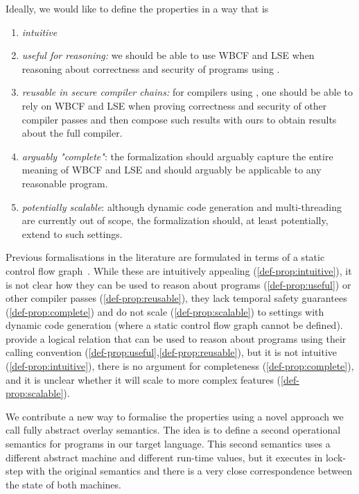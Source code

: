 \documentclass[acmsmall,screen]{acmart}\settopmatter{}
\begin{document}
Ideally, we would like to define the properties in a way that is
\begin{enumerate}
\item {\itshape intuitive} \label{def-prop:intuitive}
\item {\itshape useful for reasoning:} we should be able to use WBCF and LSE when reasoning about correctness and security of programs using \stktokens{}. \label{def-prop:useful}
\item {\itshape reusable in secure compiler chains:} for compilers using \stktokens{}, one should be able to rely on WBCF and LSE when proving correctness and security of other compiler passes and then compose such results with ours to obtain results about the full compiler.\label{def-prop:reusable}
\item {\itshape arguably "complete"}: the formalization should arguably capture the entire meaning of WBCF and LSE and should arguably be applicable to any reasonable program. \label{def-prop:complete}
\item {\itshape potentially scalable}: although dynamic code generation and multi-threading are currently out of scope, the formalization should, at least potentially, extend to such settings.\label{def-prop:scalable}
\end{enumerate}

Previous formalisations in the literature are formulated in terms of a static control flow graph~\cite[e.g., ][]{Abadi2005Theory}.
While these are intuitively appealing (\ref{def-prop:intuitive}), it is not clear how they can be used to reason about programs (\ref{def-prop:useful}) or other compiler passes (\ref{def-prop:reusable}), they lack temporal safety guarantees (\ref{def-prop:complete}) and do not scale (\ref{def-prop:scalable}) to settings with dynamic code generation (where a static control flow graph cannot be defined).
\citet{skorstengaard_reasoning_2017} provide a logical relation that
can be used to reason about programs using their calling convention
(\ref{def-prop:useful},\ref{def-prop:reusable}), but it is not intuitive (\ref{def-prop:intuitive}), there is no argument for completeness (\ref{def-prop:complete}), and it is unclear whether it will scale to more complex features (\ref{def-prop:scalable}).

We contribute a new way to formalise the properties using a novel approach we call fully abstract overlay semantics.
The idea is to define a second operational semantics for programs in our target language.
This second semantics uses a different abstract machine and different run-time values, but it executes in lock-step with the original semantics and there is a very close correspondence between the state of both machines.
\end{document}
